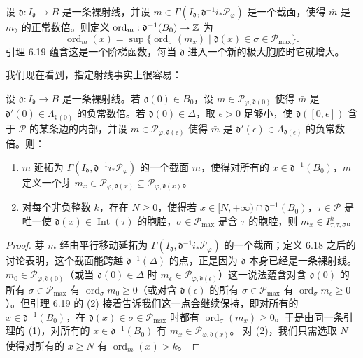 \begin{definition}
设 $\mathfrak{d}:I_{\mathfrak{d}}\to B$ 是一条裸射线，并设 $m\in\Gamma(I_{\mathfrak{d}},\mathfrak{d}^{-1}i_*\mathcal{P}_\varphi)$ 是一个截面，使得 $\bar m$ 是 $\bar m_{\mathfrak{d}}$ 的正常数倍。则定义 $\operatorname{ord}_m:\mathfrak{d}^{-1}(B_0)\to\mathbb{Z}$ 为
\[
\operatorname{ord}_m(x)=\sup\{\operatorname{ord}_\sigma(m_x)\mid \mathfrak{d}(x)\in\sigma\in\mathcal{P}_{\max}\}.
\]
引理 6.19 蕴含这是一个阶梯函数，每当 $\mathfrak{d}$ 进入一个新的极大胞腔时它就增大。
\end{definition}

我们现在看到，指定射线事实上很容易：

\begin{proposition}
设 $\mathfrak{d}:I_{\mathfrak{d}}\to B$ 是一条裸射线。若 $\mathfrak{d}(0)\in B_0$，设 $m\in\mathcal{P}_{\varphi,\mathfrak{d}(0)}$ 使得 $\bar m$ 是 $\mathfrak{d}'(0)\in\Lambda_{\mathfrak{d}(0)}$ 的负常数倍。若 $\mathfrak{d}(0)\in\Delta$，取 $\epsilon>0$ 足够小，使 $\mathfrak{d}([0,\epsilon])$ 含于 $\mathcal{P}$ 的某条边的内部，并设 $m\in\mathcal{P}_{\varphi,\mathfrak{d}(\epsilon)}$ 使得 $\bar m$ 是 $\mathfrak{d}'(\epsilon)\in\Lambda_{\mathfrak{d}(\epsilon)}$ 的负常数倍。则：
\begin{enumerate}[label=(\arabic*),leftmargin=2.2em]
\item $m$ 延拓为 $\Gamma(I_{\mathfrak{d}},\mathfrak{d}^{-1}i_*\mathcal{P}_\varphi)$ 的一个截面 $m$，使得对所有的 $x\in\mathfrak{d}^{-1}(B_0)$，$m$ 定义一个芽 $m_x\in\mathcal{P}_{\varphi,\mathfrak{d}(x)}\subseteq\mathcal{P}_{\varphi,\mathfrak{d}(x)}$。
\item 对每个非负整数 $k$，存在 $N\ge0$，使得若 $x\in[N,+\infty)\cap\mathfrak{d}^{-1}(B_0)$，$\tau\in\mathcal{P}$ 是唯一使 $\mathfrak{d}(x)\in\operatorname{Int}(\tau)$ 的胞腔，$\sigma\in\mathcal{P}_{\max}$ 是含 $\tau$ 的胞腔，则 $m_x\in I^k_{\tau,\tau,\sigma}$。
\end{enumerate}
\end{proposition}

\begin{proof}
芽 $m$ 经由平行移动延拓为 $\Gamma(I_{\mathfrak{d}},\mathfrak{d}^{-1}i_*\mathcal{P}_\varphi)$ 的一个截面；定义 6.18 之后的讨论表明，这个截面能跨越 $\mathfrak{d}^{-1}(\Delta)$ 的点，正是因为 $\mathfrak{d}$ 本身已经是一条裸射线。
$m_0\in\mathcal{P}_{\varphi,\mathfrak{d}(0)}$（或当 $\mathfrak{d}(0)\in\Delta$ 时 $m_\epsilon\in\mathcal{P}_{\varphi,\mathfrak{d}(\epsilon)}$）这一说法蕴含对含 $\mathfrak{d}(0)$ 的所有 $\sigma\in\mathcal{P}_{\max}$ 有 $\operatorname{ord}_\sigma m_0\ge0$（或对含 $\mathfrak{d}(\epsilon)$ 的所有 $\sigma\in\mathcal{P}_{\max}$ 有 $\operatorname{ord}_\sigma m_\epsilon\ge0$）。但引理 6.19 的 (2) 接着告诉我们这一点会继续保持，即对所有的 $x\in\mathfrak{d}^{-1}(B_0)$，在 $\mathfrak{d}(x)\in\sigma\in\mathcal{P}_{\max}$ 时都有 $\operatorname{ord}_\sigma(m_x)\ge0$。于是由同一条引理的 (1)，对所有的 $x\in\mathfrak{d}^{-1}(B_0)$ 有 $m_x\in\mathcal{P}_{\varphi,\mathfrak{d}(x)}$。
对 (2)，我们只需选取 $N$ 使得对所有的 $x\ge N$ 有 $\operatorname{ord}_m(x)>k$。
\end{proof}

